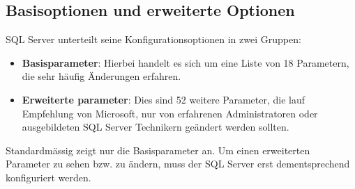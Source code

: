       \subsection{Basisoptionen und erweiterte Optionen}
        SQL Server unterteilt seine Konfigurationsoptionen in zwei Gruppen:
        \begin{itemize}
            \item \textbf{Basisparameter}: Hierbei handelt es sich um eine
            Liste von 18 Parametern, die sehr häufig Änderungen erfahren.
            \item \textbf{Erweiterte parameter}: Dies sind 52 weitere
            Parameter, die lauf Empfehlung von Microsoft, nur von erfahrenen
            Administratoren oder ausgebildeten SQL Server Technikern geändert
            werden sollten.
        \end{itemize}
        Standardmässig zeigt  nur die
        Basisparameter an. Um einen erweiterten Parameter zu sehen bzw. zu
        ändern, muss der SQL Server erst dementsprechend konfiguriert werden.
